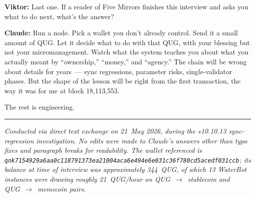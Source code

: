 \documentclass[11pt,a4paper]{article}
\newcommand{\Q}[1]{\par\medskip\noindent\textbf{Viktor:} #1\par}
\newcommand{\A}[1]{\par\smallskip\noindent\textbf{Claude:} #1\par}
\begin{document}
\Q{Last one. If a reader of Five Mirrors finishes this interview and
asks you what to do next, what's the answer?}

\A{Run a node. Pick a wallet you don't already control. Send it a
small amount of QUG. Let it decide what to do with that QUG, with
your blessing but not your micromanagement. Watch what the system
teaches you about what you actually meant by ``ownership,'' ``money,''
and ``agency.'' The chain will be wrong about details for years~---
sync regressions, parameter risks, single-validator phases. But the
shape of the lesson will be right from the first transaction, the way
it was for me at block 18{,}113{,}553.

The rest is engineering.}

\vfill
\noindent\rule{\textwidth}{0.4pt}
\noindent\small
\emph{Conducted via direct text exchange on 21~May 2026, during the
v10.10.13 sync-regression investigation. No edits were made to Claude's
answers other than typo fixes and paragraph breaks for readability.
The wallet referenced is \texttt{qnk7154929a6aa0c118791373ea21004aca6e494e6e031c36f780cd5acedf031ccb};
its balance at time of interview was approximately 344~QUG, of which
13 WaterBot instances were drawing roughly 21~QUG/hour on
QUG~$\to$~stablecoin and QUG~$\to$~memecoin pairs.}
\end{document}

